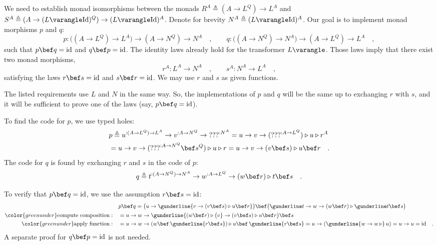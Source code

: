 We need to establish monad isomorphisms between the monads $R^{A}\triangleq(A\rightarrow L^{Q})\rightarrow L^{A}$
and $S^{A}\triangleq(A\rightarrow(L\varangle\text{Id})^{Q})\rightarrow(L\varangle\text{Id})^{A}$.
Denote for brevity $N^{A}\triangleq(L\varangle\text{Id})^{A}$. Our
goal is to implement monad morphisms $p$ and $q$:
\[
p:\big((A\rightarrow L^{Q})\rightarrow L^{A}\big)\rightarrow(A\rightarrow N^{Q})\rightarrow N^{A}\quad,\quad\quad q:\big((A\rightarrow N^{Q})\rightarrow N^{A}\big)\rightarrow(A\rightarrow L^{Q})\rightarrow L^{A}\quad,
\]
such that $p\bef q=\text{id}$ and $q\bef p=\text{id}$. The identity
laws already hold for the transformer $L\varangle$. Those laws imply
that there exist two monad morphisms,
\[
r^{A}:L^{A}\rightarrow N^{A}\quad,\quad\quad s^{A}:N^{A}\rightarrow L^{A}\quad,
\]
 satisfying the laws $r\bef s=\text{id}$ and $s\bef r=\text{id}$.
We may use $r$ and $s$ as given functions.

The listed requirements use $L$ and $N$ in the same way. So, the
implementations of $p$ and $q$ will be the same up to exchanging
$r$ with $s$, and it will be sufficient to prove one of the laws
(say, $p\bef q=\text{id}$).

To find the code for $p$, we use typed holes:
\begin{align*}
 & p\triangleq u^{:(A\rightarrow L^{Q})\rightarrow L^{A}}\rightarrow v^{:A\rightarrow N^{Q}}\rightarrow\text{???}^{:N^{A}}=u\rightarrow v\rightarrow(\text{???}^{:A\rightarrow L^{Q}})\triangleright u\triangleright r^{A}\\
 & =u\rightarrow v\rightarrow(\text{???}^{:A\rightarrow N^{Q}}\bef s^{Q})\triangleright u\triangleright r=u\rightarrow v\rightarrow(v\bef s)\triangleright u\bef r\quad.
\end{align*}
The code for $q$ is found by exchanging $r$ and $s$ in the code
of $p$:
\[
q\triangleq t^{:(A\rightarrow N^{Q})\rightarrow N^{A}}\rightarrow w^{:A\rightarrow L^{Q}}\rightarrow(w\bef r)\triangleright t\bef s\quad.
\]

To verify that $p\bef q=\text{id}$, we use the assumption $r\bef s=\text{id}$:
\begin{align*}
 & p\bef q=\big(u\rightarrow\gunderline{v\rightarrow(v\bef s)\triangleright u\bef r}\big)\bef\big(\gunderline t\rightarrow w\rightarrow(w\bef r)\triangleright\gunderline t\bef s\big)\\
{\color{greenunder}\text{compute composition}:}\quad & =u\rightarrow w\rightarrow\gunderline{(w\bef r)\triangleright\big(v}\rightarrow(v\bef s)\triangleright u\bef r\big)\bef s\\
{\color{greenunder}\text{apply function}:}\quad & =u\rightarrow w\rightarrow(w\bef\,\gunderline{r\bef s})\triangleright u\bef\,\gunderline{r\bef s}=u\rightarrow(\gunderline{w\rightarrow w\,\triangleright}\,u)=u\rightarrow u=\text{id}\quad.
\end{align*}
A separate proof for $q\bef p=\text{id}$ is not needed.

